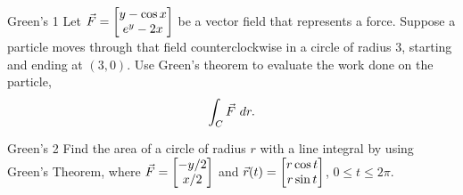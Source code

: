 \begin{exercise}{Green's 1}
Let $\vec{F}=\begin{bmatrix}y-\cos x\\e^y-2x\end{bmatrix}$ be a vector field that represents a force. Suppose a particle moves through that field counterclockwise in a circle of radius 3, starting and ending at $(3,0)$. Use Green's theorem to evaluate the work done on the particle, $$\int_C \vec{F} \ dr.$$
\end{exercise}

\begin{exercise}{Green's 2}
Find the area of a circle of radius $r$ with a line integral by using Green's Theorem, where $\vec{F}=\begin{bmatrix}-y/2\\x/2\end{bmatrix}$ and $\vec{r}(t)=\begin{bmatrix}r\cos t\\ r\sin t\end{bmatrix}$, $0\leq t\leq 2\pi$.
\end{exercise}
\renewcommand\thesubsection{\thesection.\arabic{subsection}}